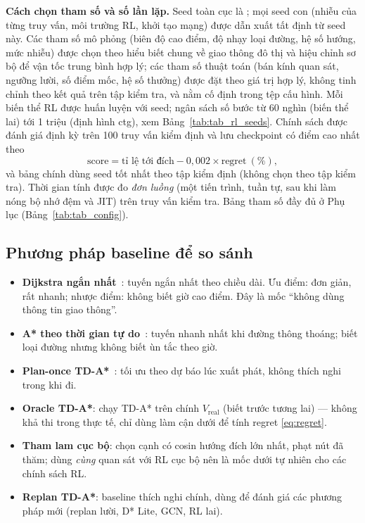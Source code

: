 \textbf{Cách chọn tham số và số lần lặp.} Seed toàn cục là \Seed{}; mọi seed con (nhiễu của từng truy vấn, môi trường RL,
khởi tạo mạng) được dẫn xuất tất định từ seed này. Các tham số mô phỏng (biên độ cao điểm, độ nhạy loại đường, hệ số
hướng, mức nhiễu) được chọn theo hiểu biết chung về giao thông đô thị và hiệu chỉnh sơ bộ để vận tốc trung bình hợp lý; các
tham số thuật toán (bán kính quan sát, ngưỡng lười, số điểm mốc, hệ số thưởng) được đặt theo giá trị hợp lý, không tinh chỉnh
theo kết quả trên tập kiểm tra, và nằm cố định trong tệp cấu hình. Mỗi biến thể RL được huấn luyện với \RlNSeeds{} seed; ngân sách số bước từ 60
nghìn (biến thể lai) tới 1 triệu (định hình ctg), xem Bảng~\ref{tab:tab_rl_seeds}. Chính sách được đánh giá định kỳ trên 100
truy vấn kiểm định và lưu checkpoint có điểm cao nhất theo
\begin{equation}
\text{score} = \text{tỉ lệ tới đích} - 0{,}002\times\text{regret}\ (\%),
\label{eq:score}
\end{equation}
và bảng chính dùng seed tốt nhất theo tập kiểm định (không chọn theo tập kiểm tra). Thời gian tính được đo \emph{đơn luồng}
(một tiến trình, tuần tự, sau khi làm nóng bộ nhớ đệm và JIT) trên \RuntimeNQ{} truy vấn kiểm tra. Bảng tham số đầy đủ ở
Phụ lục (Bảng~\ref{tab:tab_config}).

\subsection{Phương pháp baseline để so sánh}\label{sec:exp:baseline}

\begin{itemize}
    \item \textbf{Dijkstra ngắn nhất}~\cite{dijkstra1959}: tuyến ngắn nhất theo chiều dài. Ưu điểm: đơn giản, rất nhanh;
    nhược điểm: không biết giờ cao điểm. Đây là mốc ``không dùng thông tin giao thông''.
    \item \textbf{A* theo thời gian tự do}~\cite{hart1968}: tuyến nhanh nhất khi đường thông thoáng; biết loại đường nhưng không
    biết ùn tắc theo giờ.
    \item \textbf{Plan-once TD-A*}~\cite{dreyfus1969,kaufman1993}: tối ưu theo dự báo lúc xuất phát, không thích nghi trong khi đi.
    \item \textbf{Oracle TD-A*}: chạy TD-A* trên chính $V_{\text{real}}$ (biết trước tương lai) --- không khả thi trong thực tế,
    chỉ dùng làm cận dưới để tính regret \eqref{eq:regret}.
    \item \textbf{Tham lam cục bộ}: chọn cạnh có cosin hướng đích lớn nhất, phạt nút đã thăm; dùng \emph{cùng} quan sát với RL
    cục bộ nên là mốc dưới tự nhiên cho các chính sách RL.
    \item \textbf{Replan TD-A*}: baseline thích nghi chính, dùng để đánh giá các phương pháp mới (replan lười, D* Lite, GCN, RL lai).
\end{itemize}

